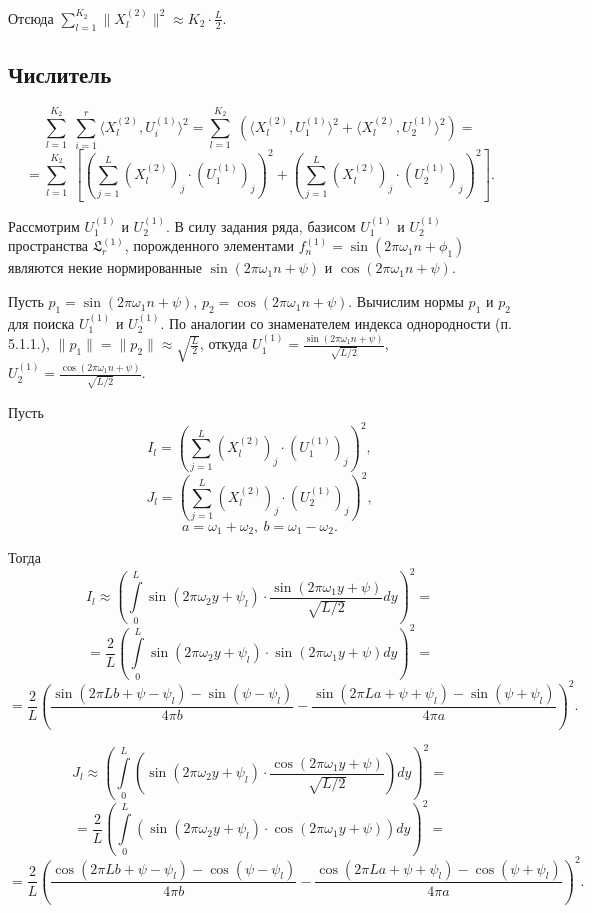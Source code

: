\documentclass[specialist, substylefile = spbu.rtx,
			   subf, href, 12pt]{disser}
\begin{document}
Отсюда $\sum\limits_{l=1}^{K_2}\|X_l^{(2)}\|^2 \approx K_2\cdot\frac{L}{2}$.


\subsection{Числитель}
$$ \sum\limits_{l=1}^{K_2}\;\sum\limits_{i=1}^{r}\langle X_l^{(2)}, U_i^{(1)}\rangle^2 = 
\sum\limits_{l=1}^{K_2}\;\left ( \langle X_l^{(2)}, U_1^{(1)}\rangle^2 + \langle X_l^{(2)}, U_2^{(1)}\rangle^2 \right ) = $$
$$ =  \sum\limits_{l=1}^{K_2}\; \left [ \left (\sum\limits_{j=1}^{L}(X_{l}^{(2)})_j\cdot (U_{1}^{(1)})_j\right )^2 + \left ( \sum\limits_{j=1}^{L}(X_{l}^{(2)})_j\cdot (U_{2}^{(1)})_j\right )^2 \right ].$$

Рассмотрим $ U_{1}^{(1)} $ и $U_{2}^{(1)} $. В силу задания ряда, базисом $ U_{1}^{(1)} $ и $U_{2}^{(1)} $ пространства $ \mathfrak{L}_r^{(1)} $, порожденного элементами $ f_n^{(1)} = \sin(2\pi\omega_1 n + \phi_1) $ являются некие нормированные $ \sin(2\pi\omega_1 n + \psi) $ и $ \cos(2\pi\omega_1 n + \psi) $.

Пусть $ p_1 = \sin(2\pi\omega_1 n + \psi) $, $ p_2 = \cos(2\pi\omega_1 n + \psi) $. Вычислим нормы $ p_1 $ и $ p_2 $ для поиска $ U_{1}^{(1)} $ и $U_{2}^{(1)} $. 
По аналогии со знаменателем индекса однородности (п. 5.1.1.), $ \|p_1\| = \|p_2\| \approx \sqrt{\frac{L}{2}} $, откуда $ U_{1}^{(1)} = \frac{\sin(2\pi\omega_1 n + \psi)}{\sqrt{L/2}} $, $ U_{2}^{(1)} = \frac{\cos(2\pi\omega_1 n + \psi)}{\sqrt{L/2}} $.

Пусть  
$$ I_l =  \left (\sum\limits_{j=1}^{L}(X_{l}^{(2)})_j\cdot (U_{1}^{(1)})_j\right )^2, $$
$$ J_l =  \left (\sum\limits_{j=1}^{L}(X_{l}^{(2)})_j\cdot (U_{2}^{(1)})_j\right )^2, $$
$$ a = \omega_1 + \omega_2,\ b = \omega_1 - \omega_2. $$

Тогда
$$ I_l \approx \left( \int\limits_{0}^{L}\sin(2\pi\omega_2 y + \psi_l) \cdot \frac{\sin(2\pi\omega_1 y + \psi)}{\sqrt{L/2}}dy \right)^2 = $$
$$ = \frac{2}{L} \left(\int\limits_{0}^{L}\sin(2\pi\omega_2 y + \psi_l) \cdot \sin(2\pi\omega_1 y + \psi)dy\right )^2 = $$
$$ = \frac{2}{L} 
\left(  
\frac{\sin(2\pi Lb + \psi - \psi_l) - \sin(\psi - \psi_l)}{4\pi b} - \frac{\sin(2\pi La + \psi + \psi_l) - \sin(\psi + \psi_l)}{4\pi a}
\right)^2. $$



$$ J_l \approx \left(\int\limits_{0}^{L}(\sin(2\pi\omega_2 y + \psi_l) \cdot \frac{\cos(2\pi\omega_1 y + \psi)}{\sqrt{L/2}})dy\right)^2 = $$
$$ = \frac{2}{L}\left(\int\limits_{0}^{L}(\sin(2\pi\omega_2 y + \psi_l) \cdot\cos(2\pi\omega_1 y + \psi))dy\right )^2 = $$
$$ = \frac{2}{L} 
\left(  
\frac{\cos(2\pi Lb + \psi - \psi_l) - \cos(\psi - \psi_l)}{4\pi b} - \frac{\cos(2\pi La + \psi + \psi_l) - \cos(\psi + \psi_l)}{4\pi a}
\right)^2. $$
\end{document}

